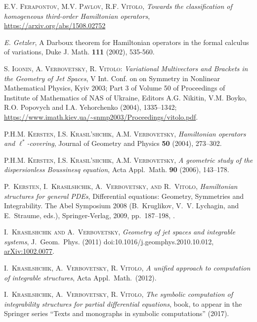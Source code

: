 \begin{thebibliography}{999}
 \textsc{E.V. Ferapontov, M.V. Pavlov, R.F. Vitolo},
\emph{Towards the classification of homogeneous third-order Hamiltonian
  operators}, \url{https://arxiv.org/abs/1508.02752}

 \emph{E. Getzler}, A Darboux theorem for Hamiltonian
operators in the formal calculus of variations, Duke J. Math. \textbf{111}
(2002), 535-560.

\textsc{S. Igonin, A. Verbovetsky, R. Vitolo:}
  \emph{Variational Multivectors and Brackets in the Geometry of Jet Spaces}, V
  Int. Conf. on on Symmetry in Nonlinear Mathematical Physics, Kyiv 2003; Part
  3 of Volume 50 of Proceedings of Institute of Mathematics of NAS of Ukraine,
  Editors A.G.  Nikitin, V.M. Boyko, R.O. Popovych and I.A. Yehorchenko (2004),
  1335--1342; \url{https://www.imath.kiev.ua/~snmp2003/Proceedings/vitolo.pdf}.

 \textsc{P.H.M. Kersten, I.S. Krasil'shchik, A.M. Verbovetsky,}
  \emph{Hamiltonian operators and $\ell^*$-covering}, Journal of Geometry and
  Physics \textbf{50} (2004), 273--302.

 \textsc{P.H.M. Kersten, I.S. Krasil'shchik, A.M. Verbovetsky,}
  \emph{A geometric study of the dispersionless Boussinesq equation}, Acta
  Appl.\ Math. \textbf{90} (2006), 143--178.

 \textsc{P.~Kersten,
  I.~Krasil{\cprime}shchik, A.~Verbovetsky, and R.~Vitolo}, \emph{Hamiltonian
    structures for general {PDE}s}, Differential equations: Geometry,
  Symmetries and Integrability. The Abel Symposium 2008 (B.~Kruglikov,
  V.~V. Lychagin, and E.~Straume, eds.), Springer-Verlag, 2009, pp.~187--198,
  .

 \textsc{I.~Krasil{\cprime}shchik and A.~Verbovetsky},
  \emph{Geometry of jet spaces and integrable systems}, J.\ Geom.\
  Phys. (2011) doi:10.1016/j.geomphys.2010.10.012, \url{arXiv:1002.0077}.

 \textsc{I.~Krasil{\cprime}shchik, A.~Verbovetsky,
    R. Vitolo},  \emph{A unified approach to computation of integrable
    structures}, Acta Appl.\ Math.\ (2012).

 \textsc{I.~Krasil{\cprime}shchik, A.~Verbovetsky,
    R. Vitolo},  \emph{The symbolic computation of integrability structures for
    partial differential equations}, book, to appear in the Springer series
``Texts and monographs in symbolic computations'' (2017).


\end{thebibliography}

